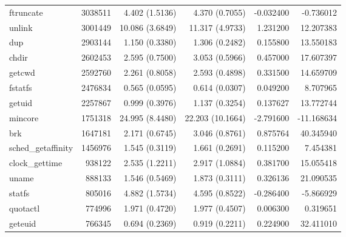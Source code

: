 \begin{longtable}{>{\ttfamily}lrrrrr}
                      ftruncate &     3038511 &           4.402 (1.5136) &           4.370 (0.7055) &       -0.032400 &    -0.736012 \\
                         unlink &     3001449 &          10.086 (3.6849) &          11.317 (4.9733) &        1.231200 &    12.207383 \\
                            dup &     2903144 &           1.150 (0.3380) &           1.306 (0.2482) &        0.155800 &    13.550183 \\
                          chdir &     2602453 &           2.595 (0.7500) &           3.053 (0.5966) &        0.457000 &    17.607397 \\
                         getcwd &     2592760 &           2.261 (0.8058) &           2.593 (0.4898) &        0.331500 &    14.659709 \\
                        fstatfs &     2476834 &           0.565 (0.0595) &           0.614 (0.0307) &        0.049200 &     8.707965 \\
                         getuid &     2257867 &           0.999 (0.3976) &           1.137 (0.3254) &        0.137627 &    13.772744 \\
                        mincore &     1751318 &          24.995 (8.4480) &         22.203 (10.1664) &       -2.791600 &   -11.168634 \\
                            brk &     1647181 &           2.171 (0.6745) &           3.046 (0.8761) &        0.875764 &    40.345940 \\
             sched\_getaffinity &     1456976 &           1.545 (0.3119) &           1.661 (0.2691) &        0.115200 &     7.454381 \\
                 clock\_gettime &      938122 &           2.535 (1.2211) &           2.917 (1.0884) &        0.381700 &    15.055418 \\
                          uname &      888133 &           1.546 (0.5469) &           1.873 (0.3111) &        0.326136 &    21.090535 \\
                         statfs &      805016 &           4.882 (1.5734) &           4.595 (0.8522) &       -0.286400 &    -5.866929 \\
                       quotactl &      774996 &           1.971 (0.4720) &           1.977 (0.4507) &        0.006300 &     0.319651 \\
                        geteuid &      766345 &           0.694 (0.2369) &           0.919 (0.2211) &        0.224900 &    32.411010 \\

\end{longtable}
